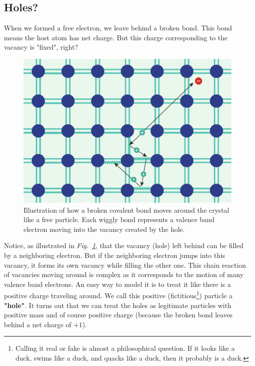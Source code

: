 \subsection{Holes?}
When we formed a free electron, we leave behind a broken bond.  This bond means the host atom has net charge.  But this charge corresponding to the vacancy is "fixed", right?
\begin{figure}[tb]
\centering
\includegraphics[width=.5\columnwidth]{silicon_hole}
\caption{Illustration of how a broken covalent bond moves around the crystal like a free particle.   Each wiggly bond represents a valence band electron moving into the vacancy created by the hole.} \label{fig:silicon_hole}
\end{figure}
Notice, as illustrated in \emph{Fig.~\ref{fig:silicon_hole}},  that the vacancy (hole) left behind can be filled by a neighboring electron.   But if the neighboring electron jumps into this vacancy, it forms its own vacancy while filling the other one.  This chain reaction of vacancies moving around is complex as it corresponds to the motion of many valence band electrons.  An easy way to model it is to treat it like there is a positive charge traveling around.  We call this positive (fictitious\footnote{Calling it real or fake is almost a philosophical question.  If it looks like a duck, swims like a duck, and quacks like a duck, then it probably is a duck.}) particle a \textbf{"hole"}.  It turns out that we can treat the holes as legitimate particles with positive mass and of course positive charge (because the broken bond leaves behind a net charge of $+1$).
